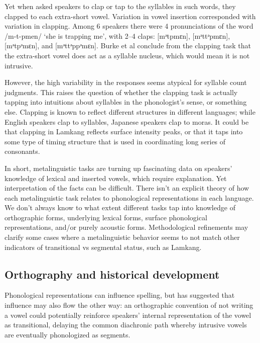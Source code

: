 \documentclass[output=paper,colorlinks,citecolor=brown]{langscibook}
\begin{document}
Yet when \citet{Burkeetal2019} asked speakers to clap or tap to the syllables in such words, they clapped to each extra-short vowel. Variation in vowel insertion corresponded with variation in clapping. Among 6 speakers there were 4 pronunciations of the word /m-t-pmen/ ‘she is trapping me’, with 2--4 claps: [mᵊtpmɛn], [mᵊttᵊpmɛn], [mᵊtpᵊmɛn], and [mᵊttᵊppᵊmɛn]. Burke et al conclude from the clapping task that the extra-short vowel does act as a syllable nucleus, which would mean it is not intrusive. 

However, the high variability in the responses seems atypical for syllable count judgments. This raises the question of whether the clapping task is actually tapping into intuitions about syllables in the phonologist’s sense, or something else. Clapping is known to reflect different structures in different languages; while English speakers clap to syllables, Japanese speakers clap to moras. It could be that clapping in Lamkang reflects surface intensity peaks, or that it taps into some type of timing structure that is used in coordinating long series of consonants. 

\begin{sloppypar}
In short, metalinguistic tasks are turning up fascinating data on speakers’ knowledge of lexical and inserted vowels, which require explanation. Yet interpretation of the facts can be difficult. There isn’t an explicit theory of how each metalinguistic task relates to phonological representations in each language. We don’t always know to what extent different tasks tap into knowledge of orthographic forms, underlying lexical forms, surface phonological representations, and/or purely acoustic forms. Methodological refinements may clarify some cases where a metalinguistic behavior seems to not match other indicators of transitional
vs segmental status, such as Lamkang. 
\end{sloppypar}

\subsection{Orthography and historical development}
Phonological representations can influence spelling, but \citet{Bellik2019a} has suggested that influence may also flow the other way: an orthographic convention of not writing a vowel could potentially reinforce speakers’ internal representation of the vowel as transitional, delaying the common diachronic path whereby intrusive vowels are eventually phonologized as segments. 
\end{document}
